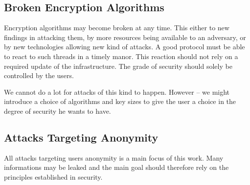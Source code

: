 \subsection{Broken Encryption Algorithms}
Encryption algorithms may become broken at any time. This either to new findings in attacking them, by more resources being available to an adversary, or by new technologies allowing new kind of attacks. A good protocol must be able to react to such threads in a timely manor. This reaction should not rely on a required update of the infrastructure. The grade of security should solely be controlled by the users. 

We cannot do a lot for attacks of this kind to happen. However -- we might introduce a choice of algorithms and key sizes to give the user a choice in the degree of security he wants to have.

\subsection{Attacks Targeting Anonymity}
All attacks targeting users anonymity is a main focus of this work. Many informations may be leaked and the main goal should therefore rely on the principles established in security.

